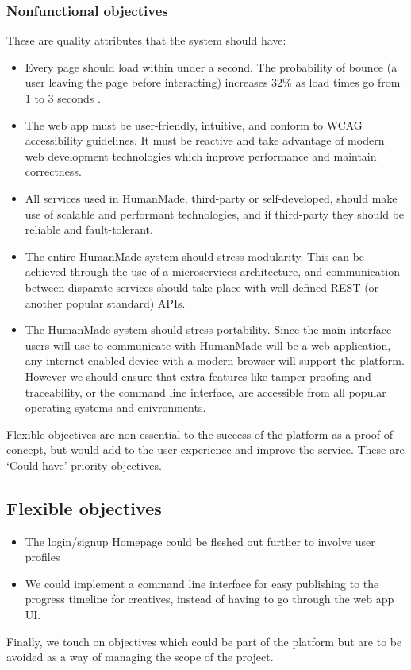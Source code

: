 \documentclass[12pt,a4paper]{article}
\begin{document}
\subsubsection{Nonfunctional objectives}
These are quality attributes that the system should have:
\begin{itemize}
    \item Every page should load within under a second. The probability of bounce (a user leaving the page before interacting) increases 32\% as load times go from 1 to 3 seconds \cite{googleload}.
    \item The web app must be user-friendly, intuitive, and conform to WCAG accessibility guidelines. It must be reactive and take advantage of modern web development technologies which improve performance and maintain correctness. 
    \item All services used in HumanMade, third-party or self-developed, should make use of scalable and performant technologies, and if third-party they should be reliable and fault-tolerant.
    \item The entire HumanMade system should stress modularity. This can be achieved through the use of a microservices architecture, and communication between disparate services should take place with well-defined REST (or another popular standard) APIs. 
    \item The HumanMade system should stress portability. Since the main interface users will use to communicate with HumanMade will be a web application, any internet enabled device with a modern browser will support the platform. However we should ensure that extra features like tamper-proofing and traceability, or the command line interface, are accessible from all popular operating systems and enivronments.
\end{itemize}

\noindent Flexible objectives are non-essential to the success of the platform as a proof-of-concept, but would add to the user experience and improve the service. These are `Could have' priority objectives.
\subsection{Flexible objectives}
\begin{itemize}
    \item The login/signup Homepage could be fleshed out further to involve user profiles
    \item We could implement a command line interface for easy publishing to the progress timeline for creatives, instead of having to go through the web app UI.
\end{itemize}
Finally, we touch on objectives which could be part of the platform but are to be avoided as a way of managing the scope of the project. 
\end{document}
